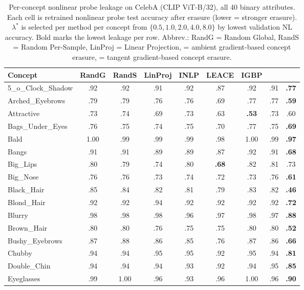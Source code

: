 \begin{table}[p]
\centering
\caption{Per-concept nonlinear probe leakage on CelebA (CLIP ViT-B/32), all 40 binary attributes. Each cell is retrained nonlinear probe test accuracy after erasure (lower = stronger erasure). $\lambda^*$ is selected per method per concept from $\{0.5, 1.0, 2.0, 4.0, 8.0\}$ by lowest validation NL accuracy. Bold marks the lowest leakage per row. Abbrev.: RandG = Random Global, RandS = Random Per-Sample, LinProj = Linear Projection, \AmbGCE{} = ambient gradient-based concept erasure, \TanGCE{} = tangent gradient-based concept erasure.}
\label{tab:celeba_clip_all40_per_concept_leak}
\footnotesize
\setlength{\tabcolsep}{3pt}
\begin{tabular}{l|cccccccc}
\toprule
Concept & RandG & RandS & LinProj & INLP & LEACE & IGBP & \AmbGCE{} & \TanGCE{} \\
\midrule
5\_o\_Clock\_Shadow & .92 & .92 & .91 & .92 & .87 & .92 & .91 & \textbf{.77} \\
Arched\_Eyebrows & .79 & .79 & .76 & .76 & .69 & .77 & .77 & \textbf{.59} \\
Attractive & .73 & .74 & .69 & .73 & .63 & \textbf{.53} & .73 & .60 \\
Bags\_Under\_Eyes & .76 & .75 & .74 & .75 & .70 & .77 & .75 & \textbf{.69} \\
Bald & 1.00 & .99 & .99 & .99 & .98 & 1.00 & .99 & \textbf{.97} \\
Bangs & .91 & .91 & .89 & .89 & .87 & .92 & .91 & \textbf{.68} \\
Big\_Lips & .80 & .79 & .74 & .80 & \textbf{.68} & .82 & .81 & .73 \\
Big\_Nose & .76 & .76 & .73 & .74 & .72 & .73 & .76 & \textbf{.61} \\
Black\_Hair & .85 & .84 & .82 & .81 & .79 & .83 & .82 & \textbf{.46} \\
Blond\_Hair & .92 & .92 & .94 & .92 & .92 & .92 & .92 & \textbf{.72} \\
Blurry & .98 & .98 & .98 & .96 & .97 & .98 & .97 & \textbf{.88} \\
Brown\_Hair & .80 & .80 & .76 & .75 & .75 & .80 & .80 & \textbf{.52} \\
Bushy\_Eyebrows & .87 & .88 & .86 & .85 & .76 & .87 & .86 & \textbf{.66} \\
Chubby & .94 & .94 & .95 & .95 & .92 & .95 & .94 & \textbf{.81} \\
Double\_Chin & .94 & .94 & .94 & .93 & .92 & .94 & .95 & \textbf{.85} \\
Eyeglasses & .99 & 1.00 & .96 & .93 & .96 & 1.00 & .96 & \textbf{.90} \\

\end{tabular}
\end{table}
